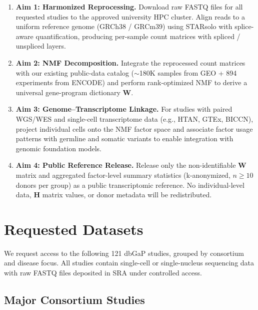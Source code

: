 \documentclass[11pt,letterpaper]{article}
\begin{document}
\begin{enumerate}[nosep]
    \item \textbf{Aim 1: Harmonized Reprocessing.}
          Download raw FASTQ files for all requested studies to the
          approved university HPC cluster. Align reads to a uniform
          reference genome (GRCh38 / GRCm39) using STARsolo with
          splice-aware quantification, producing per-sample count
          matrices with spliced / unspliced layers.

    \item \textbf{Aim 2: NMF Decomposition.}
          Integrate the reprocessed count matrices with our existing
          public-data catalog ($\sim$180K samples from GEO + 894
          experiments from ENCODE) and perform rank-optimized NMF to
          derive a universal gene-program dictionary $\mathbf{W}$.

    \item \textbf{Aim 3: Genome--Transcriptome Linkage.}
          For studies with paired WGS/WES and single-cell
          transcriptome data (e.g., HTAN, GTEx, BICCN), project
          individual cells onto the NMF factor space and associate
          factor usage patterns with germline and somatic variants to
          enable integration with genomic foundation models.

    \item \textbf{Aim 4: Public Reference Release.}
          Release only the non-identifiable $\mathbf{W}$ matrix and
          aggregated factor-level summary statistics (k-anonymized,
          $n \geq 10$ donors per group) as a public transcriptomic
          reference. No individual-level data, $\mathbf{H}$ matrix
          values, or donor metadata will be redistributed.
\end{enumerate}

\section{Requested Datasets}

We request access to the following 121 dbGaP studies, grouped by
consortium and disease focus. All studies contain single-cell or
single-nucleus sequencing data with raw FASTQ files deposited in SRA
under controlled access.

\subsection{Major Consortium Studies}
\end{document}
